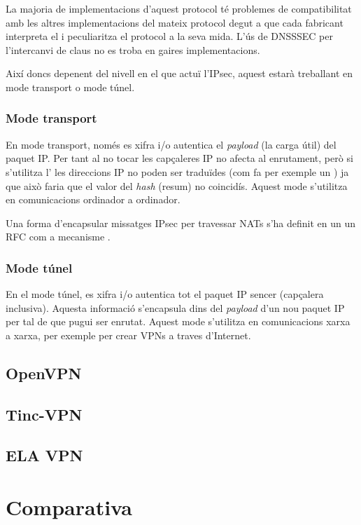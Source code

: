 La majoria de implementacions d'aquest protocol té problemes de compatibilitat amb les altres implementacions del mateix protocol degut a que cada fabricant interpreta el  i peculiaritza el protocol a la seva mida. L'ús de DNSSSEC per l'intercanvi de claus no es troba en gaires implementacions.

Així doncs depenent del nivell en el que actuï l'IPsec, aquest estarà treballant en mode transport o mode túnel.
\subsubsection{Mode transport}
En mode transport, només es xifra i/o autentica el \emph{payload} (la carga útil) del paquet IP. Per tant al no tocar les capçaleres IP no afecta al enrutament, però si s'utilitza l' les direccions IP no poden ser traduïdes (com fa per exemple un ) ja que això faria que el valor del \emph{hash} (resum) no coincidís. Aquest mode s'utilitza en comunicacions ordinador a ordinador.

Una forma d'encapsular missatges IPsec per travessar NATs s'ha definit en un un RFC com a mecanisme .
\subsubsection{Mode túnel}
En el mode túnel, es xifra i/o autentica tot el paquet IP sencer (capçalera inclusiva). Aquesta informació s'encapsula dins del \emph{payload} d'un nou paquet IP per tal de que pugui ser enrutat. Aquest mode s'utilitza en comunicacions xarxa a xarxa, per exemple per crear VPNs a traves d'Internet.

\subsection{OpenVPN}
\subsection{Tinc-VPN}
\subsection{ELA VPN}
\section{Comparativa}

